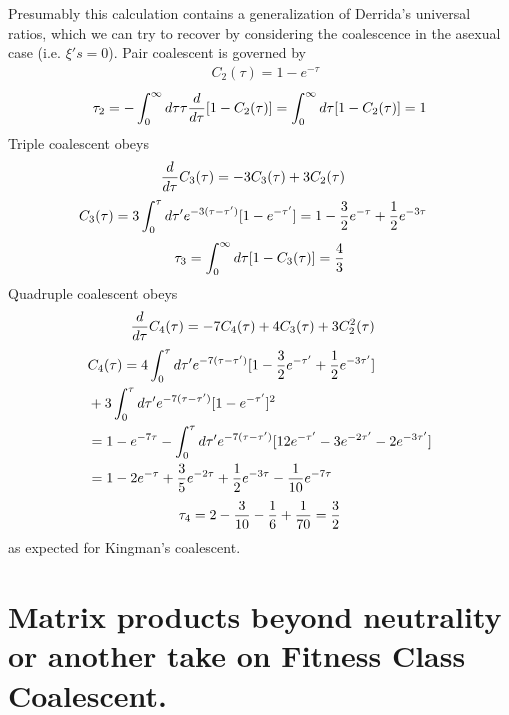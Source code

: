 \documentclass{article}
\begin{document}
Presumably this calculation contains a generalization of Derrida's universal ratios, which we can try to recover by considering the coalescence in the asexual case (i.e. $\xi 's =0$). Pair coalescent is governed by
\begin{eqnarray}
&C_2(\tau)=  1- e^{-\tau}
\end{eqnarray}
\begin{eqnarray}
\tau_2=  -\int_0^{\infty} d\tau \tau {d \over d\tau }[1-C_2 (\tau)]=\int_0^{\infty} d\tau [1-C_2 (\tau)]=1
\end{eqnarray}
Triple coalescent obeys
\begin{eqnarray}
&{ d \over d \tau} C_3(\tau)=  -3C_3(\tau)+3 C_2(\tau)
\end{eqnarray}
\begin{eqnarray}
&C_3(\tau)=  3\int_0^{\tau}d \tau' e^{-3(\tau-\tau')}[1- e^{-\tau'}]=1- {3 \over 2} e^{-\tau}+{1 \over 2}e^{-3\tau} 
\end{eqnarray}
\begin{eqnarray}
\tau_3=\int_0^{\infty} d\tau [1-C_3 (\tau)]={ 4 \over 3}
\end{eqnarray}
Quadruple coalescent obeys
\begin{eqnarray}
&{ d \over d \tau} C_4(\tau)=  -7C_4(\tau)+4C_3(\tau)+3 C_2^2(\tau)
\end{eqnarray}
\begin{eqnarray}
&C_4(\tau)=  4\int_0^{\tau}d \tau' e^{-7(\tau-\tau')}[1- {3 \over 2} e^{-\tau'}+{1 \over 2}e^{-3\tau'}]\\
&+3\int_0^{\tau}d \tau' e^{-7(\tau-\tau')}[1- e^{-\tau'}]^2\\
&=1-e^{-7\tau}-\int_0^{\tau}d \tau' e^{-7(\tau-\tau')}[12 e^{-\tau'}-3 e^{-2\tau'}-2e^{-3\tau'}]\\
&=1-2e^{-\tau}+{3 \over 5} e^{-2\tau}+{1 \over 2} e^{-3\tau}-{1\over 10} e^{-7\tau}
\end{eqnarray}
\begin{eqnarray}
\tau_4=2-{3 \over 10}-{1 \over 6}+{1 \over 70}={3 \over 2}
\end{eqnarray}
as expected for Kingman's coalescent.

\section*{Matrix products beyond neutrality or another take on Fitness Class Coalescent.}
\end{document}
